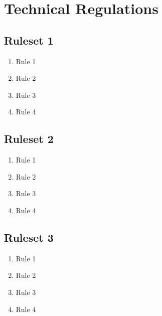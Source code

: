 \section{Technical Regulations}
\subsection{Ruleset 1}
\begin{enumerate}
	\item Rule 1
	\item Rule 2
	\item Rule 3
	\item Rule 4
\end{enumerate}  

\subsection{Ruleset 2}
\begin{enumerate}
	\item Rule 1
	\item Rule 2
	\item Rule 3
	\item Rule 4
\end{enumerate}  

\subsection{Ruleset 3}
\begin{enumerate}
	\item Rule 1
	\item Rule 2
	\item Rule 3
	\item Rule 4
\end{enumerate}